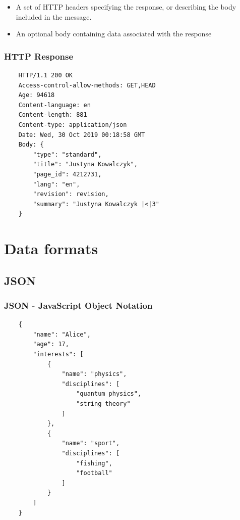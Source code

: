 \begin{frame}
{\begin{itemize}
            \item A set of HTTP headers specifying the response, or describing the body included in the message.
            \item An optional body containing data associated with the response
        \end{itemize}
    }
\end{frame}

\begin{frame}[fragile]
    \frametitle{HTTP Response}
    \begin{verbatim}
    HTTP/1.1 200 OK
    Access-control-allow-methods: GET,HEAD
    Age: 94618
    Content-language: en
    Content-length: 881
    Content-type: application/json
    Date: Wed, 30 Oct 2019 00:18:58 GMT
    Body: {
        "type": "standard",
        "title": "Justyna Kowalczyk",
        "page_id": 4212731,
        "lang": "en",
        "revision": revision,
        "summary": "Justyna Kowalczyk |<|3"
    }
    \end{verbatim}
\end{frame}

\section{Data formats}

\subsection{JSON}
\begin{frame}[fragile]
    \frametitle{JSON - JavaScript Object Notation}
    \begin{verbatim}
    {
        "name": "Alice",
        "age": 17,
        "interests": [
            {
                "name": "physics",
                "disciplines": [
                    "quantum physics",
                    "string theory"
                ]
            },
            {
                "name": "sport",
                "disciplines": [
                    "fishing",
                    "football"
                ]
            }
        ]
    }
    \end{verbatim}
\end{frame}

